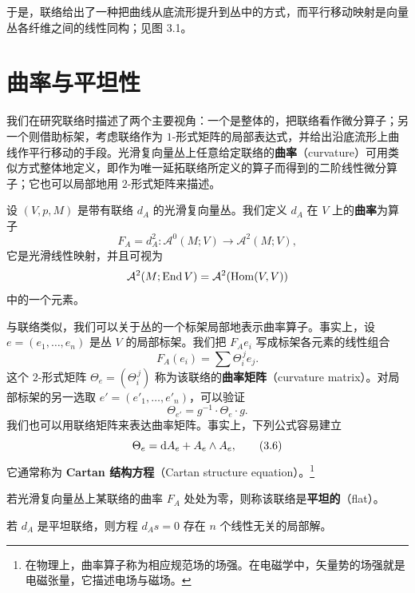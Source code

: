 于是，联络给出了一种把曲线从底流形提升到丛中的方式，而平行移动映射是向量丛各纤维之间的线性同构；见图 3.1。


\section{曲率与平坦性}

我们在研究联络时描述了两个主要视角：一个是整体的，把联络看作微分算子；另一个则借助标架，考虑联络作为 $1$-形式矩阵的局部表达式，并给出沿底流形上曲线作平行移动的手段。光滑复向量丛上任意给定联络的\textbf{曲率}（curvature）可用类似方式整体地定义，即作为唯一延拓联络所定义的算子而得到的二阶线性微分算子；它也可以局部地用 $2$-形式矩阵来描述。

\begin{definition}[3.20]
设 $(V,p,M)$ 是带有联络 $d_A$ 的光滑复向量丛。我们定义 $d_A$ 在 $V$ 上的\textbf{曲率}为算子
\[
F_A=d_A^2\colon \mathcal{A}^0(M;V)\to\mathcal{A}^2(M;V) ,
\]
它是光滑线性映射，并且可视为
\[
\mathcal{A}^2(M;\operatorname{End} V)=\mathcal{A}^2(\operatorname{Hom}(V,V))
\]
中的一个元素。
\end{definition}

与联络类似，我们可以关于丛的一个标架局部地表示曲率算子。事实上，设 $e=(e_1,\dots,e_n)$ 是丛 $V$ 的局部标架。我们把 $F_Ae_i$ 写成标架各元素的线性组合
\[
F_A(e_i)=\sum\Theta_i^{\,j}e_j .
\]
这个 $2$-形式矩阵 $\Theta_e=(\Theta_i^{\,j})$ 称为该联络的\textbf{曲率矩阵}（curvature matrix）。对局部标架的另一选取 $e'=(e'_1,\dots,e'_n)$，可以验证
\[
\Theta_{e'}=g^{-1}\cdot\Theta_e\cdot g .
\]
我们也可以用联络矩阵来表达曲率矩阵。事实上，下列公式容易建立
\begin{equation}
\Theta_e=\mathrm{d} A_e+A_e\wedge A_e , \tag{3.6}
\end{equation}
它通常称为 \textbf{Cartan 结构方程}（Cartan structure equation）。\footnote{在物理上，曲率算子称为相应规范场的场强。在电磁学中，矢量势的场强就是电磁张量，它描述电场与磁场。}

\begin{definition}[3.21]
若光滑复向量丛上某联络的曲率 $F_A$ 处处为零，则称该联络是\textbf{平坦的}（flat）。
\end{definition}

\begin{proposition}[3.22]
若 $d_A$ 是平坦联络，则方程 $d_As=0$ 存在 $n$ 个线性无关的局部解。
\end{proposition}

